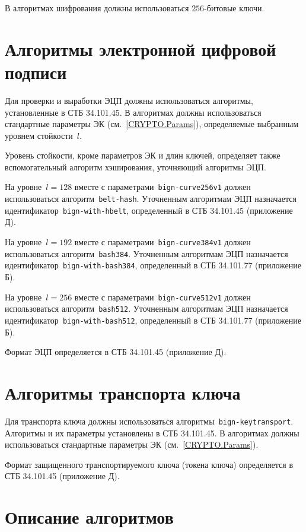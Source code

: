 В алгоритмах шифрования должны использоваться $256$-битовые ключи.

\section{Алгоритмы электронной цифровой подписи}\label{CRYPTO.Sign}

Для проверки и выработки ЭЦП должны использоваться алгоритмы,
установленные в СТБ 34.101.45. 
%
В алгоритмах должны использоваться стандартные параметры ЭК 
(см.~\ref{CRYPTO.Params}), определяемые выбранным уровнем стойкости~$l$.

Уровень стойкости, кроме параметров ЭК и длин ключей,
определяет также вспомогательный алгоритм хэширования,
уточняющий алгоритмы ЭЦП.

На уровне~$l=128$ вместе с параметрами~\texttt{bign-curve256v1}
должен использоваться алгоритм~\texttt{belt-hash}. 
Уточненным алгоритмам ЭЦП назначается идентификатор~\texttt{bign-with-hbelt}, 
определенный в СТБ 34.101.45 (приложение Д). 

На уровне~$l=192$ вместе с параметрами~\texttt{bign-curve384v1}
должен использоваться алгоритм~\texttt{bash384}. 
Уточненным алгоритмам ЭЦП назначается 
идентификатор~\texttt{bign-with-bash384},  
определенный в СТБ 34.101.77 (приложение Б).

На уровне~$l=256$ вместе с параметрами~\texttt{bign-curve512v1}
должен использоваться алгоритм~\texttt{bash512}. 
Уточненным алгоритмам ЭЦП назначается 
идентификатор~\texttt{bign-with-bash512},  
определенный в СТБ 34.101.77 (приложение Б).

Формат ЭЦП определяется в СТБ 34.101.45 (приложение Д).

\section{Алгоритмы транспорта ключа}\label{CRYPTO.Transport}

Для транспорта ключа должны использоваться 
алгоритмы~\texttt{bign-keytransport}. 
Алгоритмы и их параметры установлены в СТБ 34.101.45. 
%
В алгоритмах должны использоваться стандартные параметры 
ЭК (см.~\ref{CRYPTO.Params}). 

Формат защищенного транспортируемого ключа (токена ключа)
определяется в СТБ 34.101.45 (приложение Д). 

\section{Описание алгоритмов}\label{CRYPTO.AlgId}

